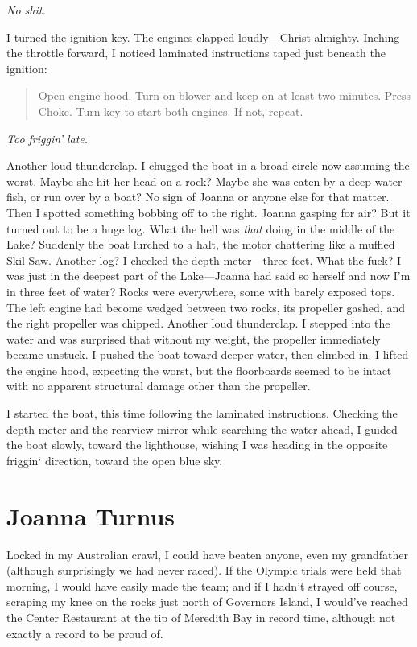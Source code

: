 \emph{No shit.}

I turned the ignition key. The engines clapped loudly---Christ almighty.
Inching the throttle forward, I noticed laminated instructions taped
just beneath the ignition:

\begin{quote}
Open engine hood. Turn on blower and keep on at least two minutes. Press
Choke. Turn key to start both engines. If not, repeat.
\end{quote}

\noindent \emph{Too friggin' late.}

Another loud thunderclap. I chugged the boat in a broad circle now
assuming the worst. Maybe she hit her head on a rock? Maybe she was
eaten by a deep-water fish, or run over by a boat? No sign of Joanna or
anyone else for that matter. Then I spotted something bobbing off to the
right. Joanna gasping for air? But it turned out to be a huge log. What
the hell was \emph{that} doing in the middle of the Lake? Suddenly the
boat lurched to a halt, the motor chattering like a muffled Skil-Saw.
Another log? I checked the depth-meter---three feet. What the fuck? I
was just in the deepest part of the Lake---Joanna had said so herself
and now I'm in three feet of water? Rocks were everywhere, some with
barely exposed tops. The left engine had become wedged between two
rocks, its propeller gashed, and the right propeller was chipped.
Another loud thunderclap. I stepped into the water and was surprised
that without my weight, the propeller immediately became unstuck. I
pushed the boat toward deeper water, then climbed in. I lifted the
engine hood, expecting the worst, but the floorboards seemed to be
intact with no apparent structural damage other than the propeller.

I started the boat, this time following the laminated instructions.
Checking the depth-meter and the rearview mirror while searching the
water ahead, I guided the boat slowly, toward the lighthouse, wishing I
was heading in the opposite friggin` direction, toward the open blue
sky.

\chapter{Joanna Turnus}

\titlemark

Locked in my Australian crawl, I could have beaten anyone, even my
grandfather (although surprisingly we had never raced). If the Olympic
trials were held that morning, I would have easily made the team; and if
I hadn't strayed off course, scraping my knee on the rocks just north of
Governors Island, I would've reached the Center Restaurant at the tip of
Meredith Bay in record time, although not exactly a record to be proud
of.

